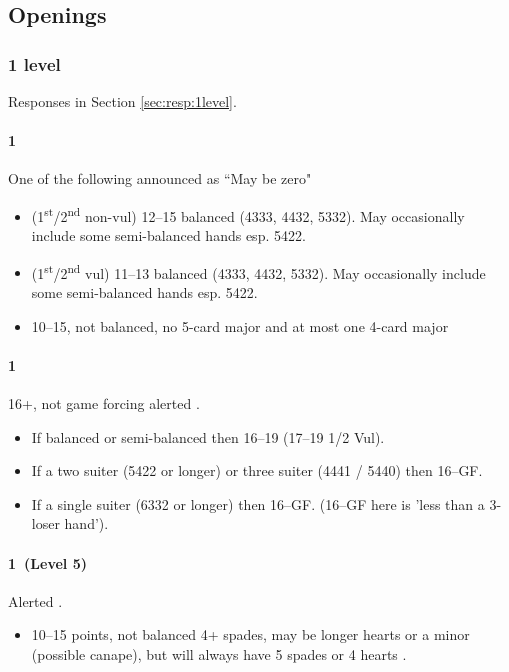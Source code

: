
\subsection{Openings}
\label{sec:openings}

\subsubsection{1 level}
\label{sec:open:1level}

Responses in Section \ref{sec:resp:1level}.

\paragraph{1\clubs}

One of the following  announced as ``May be zero" 

\begin{itemize}
\item (1\textsuperscript{st}/2\textsuperscript{nd} non-vul) 12--15 balanced (4333, 4432, 5332). May occasionally include some semi-balanced hands esp. 5422.
\item (1\textsuperscript{st}/2\textsuperscript{nd} vul) 11--13 balanced (4333, 4432, 5332). May occasionally include some semi-balanced hands esp. 5422.

\item 10--15, not balanced, no 5-card major and at most one 4-card major
\end{itemize}

\paragraph{1\diamonds}

16+, not game forcing  alerted . 
\begin{itemize}
\item If balanced or semi-balanced then 16--19 (17--19 1/2 Vul). 
\item If a two suiter (5422 or longer) or three suiter (4441 / 5440) then 16--GF. 
\item If a single suiter (6332 or longer) then 16--GF. (16--GF here is 'less than a 3-loser hand').
\end{itemize}

{\it

\paragraph{1\hearts~(Level 5)}

Alerted .

\begin{itemize}
\item 10--15 points, not balanced 4+ spades, may be longer hearts or a minor (possible canape), but will always have 5 spades or 4 hearts .
\end{itemize}

}

